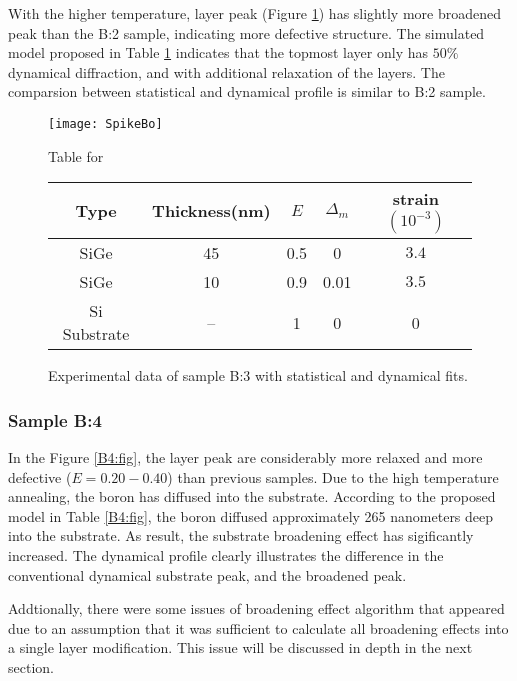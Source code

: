 With the higher temperature, layer peak (Figure \ref{B3:fig}) has slightly more broadened peak than the B:2 sample, indicating more defective structure.  The simulated model proposed in Table \ref{B3:fig} indicates that the topmost layer only has $50\%$ dynamical diffraction, and with additional relaxation of the layers.  The comparsion between statistical and dynamical profile is similar to B:2 sample.
\begin{figure}[ht]%
\caption{Experimental data of sample B:3 with statistical and dynamical fits.}
\label{B3:fig}
\begin{minipage}{\linewidth}
\texttt{[image: SpikeBo]}
\end{minipage}
\begin{minipage}{\linewidth}
\vspace{10pt}
	\centering
Table for \\
 \begin{tabular}[htbp]{@{}c|cccc@{}}
    \hline
  Type & Thickness(nm) & $E$ & $\Delta_m$ & strain $(10^{-3})$ \\
    \hline
  SiGe & 45 & 0.5 & 0 & $3.4 $  \\
  SiGe & 10 & 0.9 & 0.01 & $3.5 $  \\
    Si Substrate & -- & 1 & 0 & 0 
  \end{tabular}
\end{minipage}
\end{figure}



\subsubsection{Sample B:4}

In the Figure \ref{B4:fig}, the layer peak are considerably more relaxed and more defective ($E =0.20-0.40$) than previous samples.  Due to the high temperature annealing, the boron has diffused into the substrate.  According to the proposed model in Table \ref{B4:fig}, the boron diffused approximately 265 nanometers deep into the substrate.  As result, the substrate broadening effect has sigificantly increased.  The dynamical profile clearly illustrates the difference in the conventional dynamical substrate peak, and the broadened peak.

Addtionally, there were some issues of broadening effect algorithm that appeared due to an assumption that it was sufficient to calculate all broadening effects into a single layer modification.  This issue will be discussed in depth in the next section.


